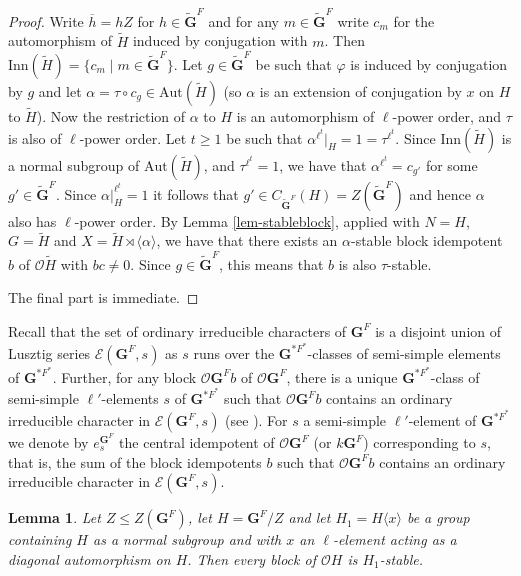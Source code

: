 \documentclass{amsart}
\theoremstyle{plain}\newtheorem{Theorem}{Theorem}[section]
\theoremstyle{plain}\newtheorem{Conjecture}[Theorem]{Conjecture}
\theoremstyle{plain}\newtheorem{Corollary}[Theorem]{Corollary}
\theoremstyle{plain}\newtheorem{Lemma}[Theorem]{Lemma}
\theoremstyle{plain}\newtheorem{Proposition}[Theorem]{Proposition}
\theoremstyle{definition}\newtheorem{Definition}[Theorem]{Definition}
\theoremstyle{definition}\newtheorem{Example}[Theorem]{Example}
\theoremstyle{definition}\newtheorem{Examples}[Theorem]{Examples}
\theoremstyle{definition}\newtheorem{Exercise}[Theorem]{Exercise}
\theoremstyle{definition}\newtheorem{Notation}[Theorem]{Notation}
\theoremstyle{definition}\newtheorem{Remark}[Theorem]{Remark}
\theoremstyle{definition}\newtheorem{Remarks}[Theorem]{Remarks}
\def\CE{{\mathcal{E}}}  \def\OR{{\mathcal{O}R}}
\def\CO{{\mathcal{O}}}    \def\OPE{{\mathcal{O}(P\rtimes E)}}
\def\Aut{\mathrm{Aut}}               \def\tenk{\otimes_k}
\def\Inn{\mathrm{Inn}}
\newcommand{\bG}{{\mathbf{G}}}
\numberwithin{equation}{section}
\begin{document}
\begin{proof} Write  $\overline{h}=hZ$ for $h \in \tilde \bG^F$ and for any $m  \in \tilde \bG^F$ write $c_m$ for the  automorphism of $\tilde  H$ induced  by conjugation with $m$. Then $\Inn(\tilde H) =\{c_m \mid m \in \tilde  \bG^F\}$. Let $g\in   \tilde \bG^F$ be such that $\varphi$ is induced by conjugation by $g$   and let $\alpha=  \tau \circ c_g\in \Aut(\tilde H)$ (so  $\alpha $  is  an extension  of conjugation by $x$ on $H$ to  $\tilde H$).  Now  the restriction of 
$\alpha $  to $H$ is  an automorphism  of $\ell$-power order,  and $\tau $  is also  of $\ell$-power order. Let $t \geq 1 $ be such that $\alpha^{\ell^t}|_{H} =1 =\tau^{\ell^t}$.  Since  $\Inn (\tilde H)$ is  a normal subgroup of $\Aut(\tilde H)$,  and $\tau^{\ell^t}=1$, we  have that  $\alpha^{\ell^t} =  c_{g'}$  for some $ g' \in  \tilde \bG^F $.  Since  $\alpha|_{H}^{\ell^t} =1$ it follows that $g'  \in  C_{\tilde \bG^F} (H)= Z(\tilde \bG^F)$ and hence  $\alpha $ also has $\ell$-power order.    By Lemma \ref{lem-stableblock},   applied  with 
$N=H$, $ G=\tilde H $  and  $ X=  \tilde H   \rtimes \langle \alpha \rangle$, we have  that   there 
exists an $\alpha$-stable  block  idempotent $b$  of  $\CO \tilde H $   with $bc \ne 0$. 
Since $ g \in \tilde \bG^F $, 
this means that  $b$ is also  $\tau$-stable. 

The final part is immediate.
\end{proof}


Recall that the  set of ordinary  irreducible characters  of $\bG^F$ is  a disjoint union of  Lusztig series  $\CE(\bG^F, s)$  as $s$ runs over the $\bG^{*F^*}$-classes of  semi-simple  elements  of $\bG^{*F^*}$.  Further, for any block  $\CO \bG^Fb $ of $\CO \bG^F$, there is a unique  $\bG^{*F^*}$-class  of  semi-simple  $\ell'$-elements $s$  of $\bG^{*F^*} $ such that $\CO \bG^Fb $   contains  an ordinary irreducible character in  $\CE(\bG^F, s)$ (see \cite[Thm.~9.12]{CaEnbook}). For  $s$  a semi-simple  $\ell'$-element of  $\bG^{*F^*}$  we  denote by  $e_s^{\bG^F}$ the  central idempotent of   $\CO  \bG^F$  (or $k\bG^F $) corresponding  to  $s$, that is,  the sum of  the block idempotents     $b$  such that  $\CO \bG^Fb $   contains  an ordinary irreducible character in  $\CE(\bG^F, s)$.

 \begin{Lemma}  Let $Z \leq  Z(\bG^F)$,  let $H=\bG^F/Z$ and  let $H_1=H\langle x \rangle $   be a  group  containing $H$ as  a normal subgroup  and with $x$ an  $\ell$-element acting as a diagonal automorphism on $H$. Then every block of $\CO H $    is $H_1$-stable.   
\end{Lemma}
\end{document}
